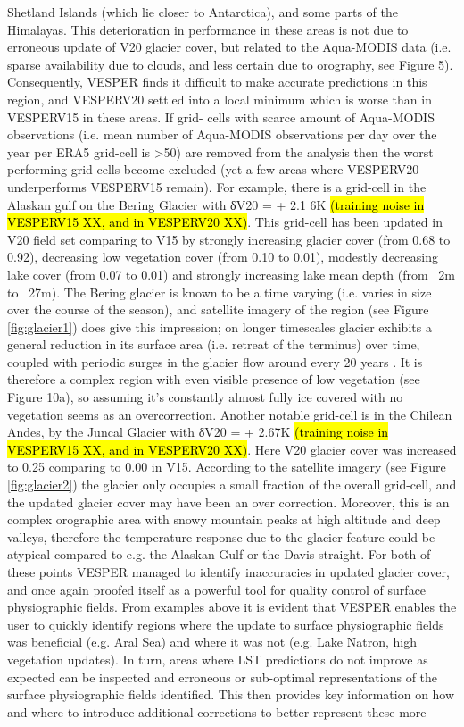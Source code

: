 \documentclass[hess, twostagejnl]{copernicus}
\begin{document}
Shetland Islands (which lie closer to Antarctica), and some parts of the Himalayas. This deterioration in performance in these areas is not due to erroneous update of V20 glacier cover, but related to the Aqua-MODIS data (i.e. sparse availability due to clouds, and less certain due to orography, see Figure 5). Consequently, VESPER finds it difficult to make accurate predictions in this region, and VESPERV20 settled into a local minimum which is worse than in VESPERV15 in these areas. If grid- cells with scarce amount of Aqua-MODIS observations (i.e. mean number of Aqua-MODIS observations per day over the year per ERA5 grid-cell is >50) are removed from the analysis then the worst performing grid-cells become excluded (yet a few areas where VESPERV20 underperforms VESPERV15 remain). For  example,  there  is  a  grid-cell  in  the  Alaskan  gulf  on  the  Bering  Glacier  with  δV20 = + 2.1 6K  \hl{(training  noise  in VESPERV15 XX, and in VESPERV20 XX)}. This grid-cell has been updated in V20 field set comparing to V15 by strongly increasing glacier cover (from 0.68 to 0.92), decreasing low vegetation cover (from 0.10 to 0.01), modestly decreasing lake cover (from 0.07 to 0.01) and strongly increasing lake mean depth (from ~2m to ~27m). The Bering glacier is known to be a time varying (i.e. varies in size over the course of the season), and satellite imagery of the region (see Figure \ref{fig:glacier1}) does give this impression; on longer timescales glacier exhibits a general reduction in its surface area (i.e. retreat of the terminus) over time, coupled with periodic surges in the glacier flow around every 20 years \citep{beiringglacier}. It is therefore a complex region with even visible presence of low vegetation (see Figure 10a), so assuming it’s constantly almost fully ice covered with no vegetation  seems  as  an  overcorrection.  Another  notable  grid-cell  is  in  the  Chilean  Andes,  by  the  Juncal  Glacier  with δV20 = + 2.67K \hl{(training noise in VESPERV15 XX, and in VESPERV20 XX)}. Here V20 glacier cover was increased to 0.25 comparing to 0.00 in V15. According to the satellite imagery (see Figure \ref{fig:glacier2}) the glacier only occupies a small fraction of the overall grid-cell, and the updated glacier cover may have been an over correction. Moreover, this is an complex orographic area with snowy mountain peaks at high altitude and deep valleys, therefore the temperature response due to the glacier feature could  be  atypical  compared  to  e.g.  the  Alaskan  Gulf  or  the  Davis  straight.  For  both  of  these  points  VESPER  managed  to identify inaccuracies in updated glacier cover, and once again proofed itself as a powerful tool for quality control of surface physiographic fields. From  examples  above  it  is  evident  that  VESPER  enables  the  user  to  quickly  identify  regions  where  the  update  to  surface physiographic fields was beneficial (e.g. Aral Sea) and where it was not (e.g. Lake Natron, high vegetation updates). In turn, areas where LST predictions do not improve as expected can be inspected and erroneous or sub-optimal representations of the surface  physiographic  fields  identified.  This  then  provides  key  information  on  how  and  where  to  introduce  additional corrections to better represent these more 
\end{document}
